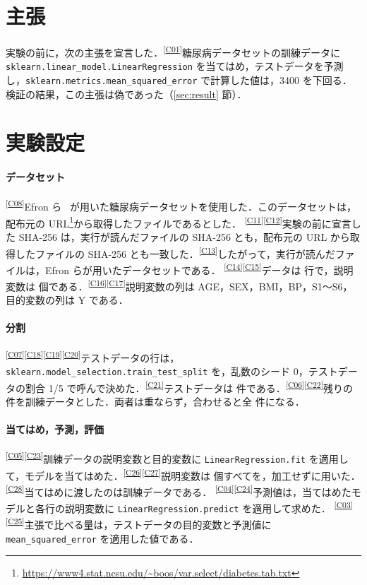 \documentclass[9pt,a4paper,twocolumn]{ltjsarticle}
\newcommand{\schemaurl}{https://github.com/auto-res2/formal-first-diabetes-regression/blob/b21140a/formal/claims.json}
\newcommand{\cid}[1]{\textsuperscript{\textsf{\scriptsize[\href{\schemaurl\#L\csname line#1\endcsname}{#1}]}}}
\newcommand{\code}[1]{\texttt{\small #1}}
\begin{document}

\section{主張}

実験の前に，次の主張を宣言した．\cid{C01}糖尿病データセットの訓練データに \code{sklearn.linear\_model.LinearRegression} を当てはめ，テストデータを予測し，\code{sklearn.metrics.mean\_squared\_error} で計算した値は，3400 を下回る．検証の結果，この主張は偽であった（\ref{sec:result} 節）．

\section{実験設定}

\paragraph{データセット}
\cid{C08}Efron ら~\cite{efron} が用いた糖尿病データセットを使用した．このデータセットは，配布元の URL\footnote{\url{https://www4.stat.ncsu.edu/~boos/var.select/diabetes.tab.txt}}から取得したファイルであるとした．
\cid{C11}\cid{C12}実験の前に宣言した SHA-256 は，実行が読んだファイルの SHA-256 とも，配布元の URL から取得したファイルの SHA-256 とも一致した．\cid{C13}したがって，実行が読んだファイルは，Efron らが用いたデータセットである．
\cid{C14}\cid{C15}データは \NSamples{} 行で，説明変数は \NFeatures{} 個である．\cid{C16}\cid{C17}説明変数の列は AGE，SEX，BMI，BP，S1〜S6，目的変数の列は Y である．

\paragraph{分割}
\cid{C07}\cid{C18}\cid{C19}\cid{C20}テストデータの行は，\code{sklearn.model\_selection.train\_test\_split} を，乱数のシード 0，テストデータの割合 1/5 で呼んで決めた．\cid{C21}テストデータは \NTest{} 件である．\cid{C06}\cid{C22}残りの \NTrain{} 件を訓練データとした．両者は重ならず，合わせると全 \NSamples{} 件になる．

\paragraph{当てはめ，予測，評価}
\cid{C05}\cid{C23}訓練データの説明変数と目的変数に \code{LinearRegression.fit} を適用して，モデルを当てはめた．\cid{C26}\cid{C27}説明変数は \NFeatures{} 個すべてを，加工せずに用いた．\cid{C28}当てはめに渡したのは訓練データである．
\cid{C04}\cid{C24}予測値は，当てはめたモデルと各行の説明変数に \code{LinearRegression.predict} を適用して求めた．
\cid{C03}\cid{C25}主張で比べる量は，テストデータの目的変数と予測値に \code{mean\_squared\_error} を適用した値である．
\end{document}
